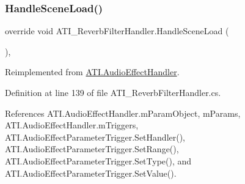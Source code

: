 \subsubsection{\texorpdfstring{Handle\+Scene\+Load()}{HandleSceneLoad()}}
{\footnotesize\ttfamily override void A\+T\+I\+\_\+\+Reverb\+Filter\+Handler.\+Handle\+Scene\+Load (\begin{DoxyParamCaption}{ }\end{DoxyParamCaption})\hspace{0.3cm}{\ttfamily [protected]}, {\ttfamily [virtual]}}



Reimplemented from \hyperlink{class_a_t_i_1_1_audio_effect_handler_aa038c62089df16a01d2749986649db11}{A\+T\+I.\+Audio\+Effect\+Handler}.



Definition at line 139 of file A\+T\+I\+\_\+\+Reverb\+Filter\+Handler.\+cs.



References A\+T\+I.\+Audio\+Effect\+Handler.\+m\+Param\+Object, m\+Params, A\+T\+I.\+Audio\+Effect\+Handler.\+m\+Triggers, A\+T\+I.\+Audio\+Effect\+Parameter\+Trigger.\+Set\+Handler(), A\+T\+I.\+Audio\+Effect\+Parameter\+Trigger.\+Set\+Range(), A\+T\+I.\+Audio\+Effect\+Parameter\+Trigger.\+Set\+Type(), and A\+T\+I.\+Audio\+Effect\+Parameter\+Trigger.\+Set\+Value().


